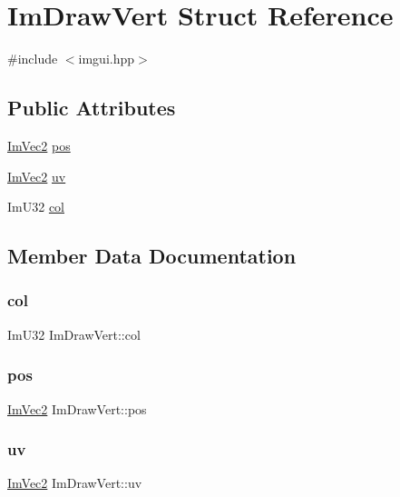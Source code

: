 \hypertarget{struct_im_draw_vert}{}\section{Im\+Draw\+Vert Struct Reference}
\label{struct_im_draw_vert}


{\ttfamily \#include $<$imgui.\+hpp$>$}

\subsection*{Public Attributes}
\begin{DoxyCompactItemize}
\item 
\hyperlink{struct_im_vec2}{Im\+Vec2} \hyperlink{struct_im_draw_vert_aedc578bbf364ddea71be12b4f177a5b4}{pos}
\item 
\hyperlink{struct_im_vec2}{Im\+Vec2} \hyperlink{struct_im_draw_vert_abdf3183529055a6c3f709b23a4bf06b1}{uv}
\item 
Im\+U32 \hyperlink{struct_im_draw_vert_ab98ba53ce2690b56f5ba94682ed83940}{col}
\end{DoxyCompactItemize}


\subsection{Member Data Documentation}
\hypertarget{struct_im_draw_vert_ab98ba53ce2690b56f5ba94682ed83940}{}\label{struct_im_draw_vert_ab98ba53ce2690b56f5ba94682ed83940} 
\subsubsection{\texorpdfstring{col}{col}}
{\footnotesize\ttfamily Im\+U32 Im\+Draw\+Vert\+::col}

\hypertarget{struct_im_draw_vert_aedc578bbf364ddea71be12b4f177a5b4}{}\label{struct_im_draw_vert_aedc578bbf364ddea71be12b4f177a5b4} 
\subsubsection{\texorpdfstring{pos}{pos}}
{\footnotesize\ttfamily \hyperlink{struct_im_vec2}{Im\+Vec2} Im\+Draw\+Vert\+::pos}

\hypertarget{struct_im_draw_vert_abdf3183529055a6c3f709b23a4bf06b1}{}\label{struct_im_draw_vert_abdf3183529055a6c3f709b23a4bf06b1} 
\subsubsection{\texorpdfstring{uv}{uv}}
{\footnotesize\ttfamily \hyperlink{struct_im_vec2}{Im\+Vec2} Im\+Draw\+Vert\+::uv}


